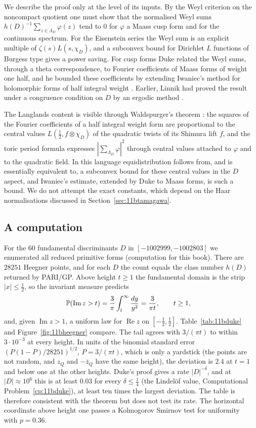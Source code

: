 We describe the proof only at the level of its inputs. By the Weyl criterion on the noncompact quotient one must show that the normalised Weyl sums $h(D)^{-1}\sum_{z\in\Lambda_D}\varphi(z)$ tend to $0$ for $\varphi$ a Maass cusp form and for the continuous spectrum. For the Eisenstein series the Weyl sum is an explicit multiple of $\zeta(s)L(s,\chi_D)$, and a subconvex bound for Dirichlet $L$ functions of Burgess type \cite{burgess1963} gives a power saving. For cusp forms Duke related the Weyl sums, through a theta correspondence, to Fourier coefficients of Maass forms of weight one half, and he bounded these coefficients by extending Iwaniec's method for holomorphic forms of half integral weight \cite{iwaniec1987}. Earlier, Linnik had proved the result under a congruence condition on $D$ by an ergodic method \cite{linnik1968}.

The Langlands content is visible through Waldspurger's theorem \cite{waldspurger1981}: the squares of the Fourier coefficients of a half integral weight form are proportional to the central values $L(\frac12,f\otimes\chi_D)$ of the quadratic twists of its Shimura lift $f$, and the toric period formula \cite{waldspurger1985} expresses $|\sum_{\Lambda_D}\varphi|^2$ through central values attached to $\varphi$ and to the quadratic field. In this language equidistribution follows from, and is essentially equivalent to, a subconvex bound for these central values in the $D$ aspect, and Iwaniec's estimate, extended by Duke to Maass forms, is such a bound. We do not attempt the exact constants, which depend on the Haar normalisations discussed in Section~\ref{sec:11btamagawa}.

\subsection{A computation}

For the $60$ fundamental discriminants $D$ in $[-1002999,-1002803]$ we enumerated all reduced primitive forms (computation for this book). There are $28251$ Heegner points, and for each $D$ the count equals the class number $h(D)$ returned by PARI/GP. Above height $t\ge1$ the fundamental domain is the strip $|x|\le\frac12$, so the invariant measure predicts
\[
\mathbb{P}(\operatorname{Im}z>t)=\frac3\pi\int_t^\infty\frac{dy}{y^2}=\frac3{\pi t},\qquad t\ge1,
\]
and, given $\operatorname{Im}z>1$, a uniform law for $\operatorname{Re}z$ on $[-\frac12,\frac12]$. Table~\ref{tab:11bduke} and Figure~\ref{fig:11bheegner} compare. The tail agrees with $3/(\pi t)$ to within $3\cdot10^{-3}$ at every height. In units of the binomial standard error $(P(1-P)/28251)^{1/2}$, $P=3/(\pi t)$, which is only a yardstick (the points are not random, and $z_Q$ and $-\bar z_Q$ have the same height), the deviation is $2.4$ at $t=1$ and below one at the other heights. Duke's proof gives a rate $|D|^{-\delta}$, and at $|D|\approx10^6$ this is at least $0.03$ for every $\delta\le\frac14$ (the Lindel\"of value, Computational Problem~\ref{cp:11bduke}), at least ten times the largest deviation. The table is therefore consistent with the theorem but does not test its rate. The horizontal coordinate above height one passes a Kolmogorov Smirnov test for uniformity with $p=0.36$.

